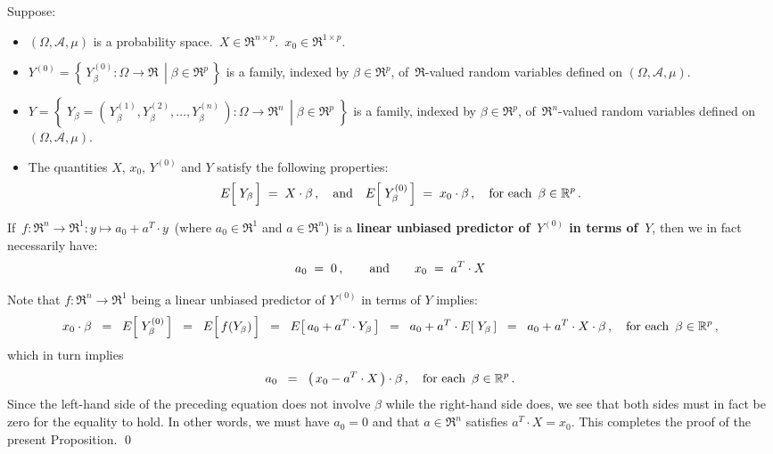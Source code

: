 \begin{proposition}
\mbox{}
\vskip 0.1cm
\noindent
Suppose:
\begin{itemize}
\item
	$(\Omega,\mathcal{A},\mu)$ is a probability space.
	\,$X \in \Re^{n \times p}$.\,
	$x_{0} \in \Re^{1 \times p}$.
\item
	$Y^{(0)} = \left\{\,\left.Y^{(0)}_{\beta} : \Omega \longrightarrow \Re\,\;\right\vert\;\beta\in\Re^{p}\,\right\}$
	is a family, indexed by $\beta \in \Re^{p}$, of \,$\Re$-valued random variables
	defined on $(\Omega,\mathcal{A},\mu)$.
\item
	$Y = \left\{\;Y_{\beta} = \left.(\,Y^{(1)}_{\beta}, Y^{(2)}_{\beta}, \ldots, Y^{(n)}_{\beta}\,)
	: \Omega \longrightarrow \Re^{n}\,\;\right\vert\; \beta \in \Re^{p} \;\right\}$
	is a family, indexed by $\beta \in \Re^{p}$, of \,$\Re^{n}$-valued random variables
	defined on $(\Omega,\mathcal{A},\mu)$.
\item
	The quantities $X$, $x_{0}$, $Y^{(0)}$ and $Y$ satisfy the following properties:
	\begin{equation*}
	E\!\left[\;\overset{{\color{white}.}}{Y_{\beta}}\,\right] \; = \; X \cdot \beta\,,
	\quad\textnormal{and}\quad
	E\!\left[\;Y^{(0)}_{\beta}\,\right] \; = \; x_{0} \cdot \beta\,,
	\quad
	\textnormal{for each \,$\beta \in \Re^{p}$}\,.
	\end{equation*}
\end{itemize}
If \,$f : \Re^{n} \longrightarrow \Re^{1} : y \longmapsto a_{0} + a^{T} \cdot y$\,
(where $a_{0} \in \Re^{1}$ and $a \in \Re^{n}$) is a
\textbf{linear unbiased predictor of \,$Y^{(0)}$ in terms of \,$Y$},
then we in fact necessarily have:
\begin{equation*}
a_{0} \; = \; 0\,,
\quad\quad\textnormal{and}\quad\quad
x_{0} \; = \; a^{T} \cdot X
\end{equation*}
\end{proposition}
\proof
Note that $f : \Re^{n} \longrightarrow \Re^{1}$ being
a linear unbiased predictor of $Y^{(0)}$ in terms of $Y$ implies:
\begin{equation*}
x_{0} \cdot \beta
\;\; = \;\;
	E\!\left[\;Y^{(0)}_{\beta}\,\right]
\;\; = \;\;
	E\!\left[\,\overset{{\color{white}.}}{f}(Y_{\beta})\,\right]
\;\; = \;\;
	E\!\left[\,a_{0} + a^{T}\cdot Y_{\beta}\,\right]
\;\; = \;\;
	a_{0} + a^{T}\cdot E\!\left[\;Y_{\beta}\,\right]
\;\; = \;\;
	a_{0} + a^{T}\cdot X \cdot \beta\,,
	\quad
	\textnormal{for each \,$\beta\in\Re^{p}$}\,,
\end{equation*}
which in turn implies
\begin{equation*}
a_{0}
\;\; = \;\;
	\left(\,x_{0} - a^{T}\cdot X\,\right) \cdot \beta\,,
	\quad
	\textnormal{for each \,$\beta\in\Re^{p}$}\,.
\end{equation*}
Since the left-hand side of the preceding equation does not involve $\beta$
while the right-hand side does, we see that both sides must in fact be zero for the equality to hold.
In other words, we must have $a_{0} = 0$ and that $a \in \Re^{n}$ satisfies $a^{T} \cdot X = x_{0}$.
This completes the proof of the present Proposition.
\qed

